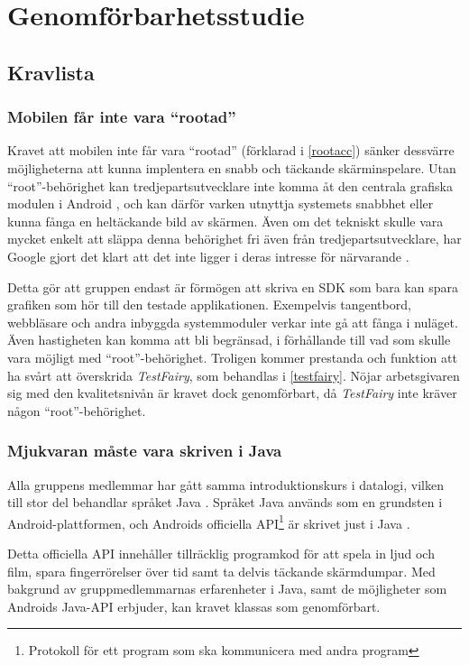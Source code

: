 \section{Genomförbarhetsstudie}
\subsection{Kravlista}
\subsubsection{Mobilen får inte vara ``rootad''}
Kravet att mobilen inte får vara ``rootad'' (förklarad i \ref{rootacc}) sänker dessvärre möjligheterna att kunna implentera en snabb och täckande skärminspelare. Utan ``root''-behörighet kan tredjepartsutvecklare inte komma åt den centrala grafiska modulen i Android \parencite{adoc}, och kan därför varken utnyttja systemets snabbhet eller kunna fånga en heltäckande bild av skärmen. Även om det tekniskt skulle vara mycket enkelt att släppa denna behörighet fri även från tredjepartsutvecklare, har Google gjort det klart att det inte ligger i deras intresse för närvarande \parencite{uhno}.

Detta gör att gruppen endast är förmögen att skriva en SDK som bara kan spara grafiken som hör till den testade applikationen. Exempelvis tangentbord, webbläsare och andra inbyggda systemmoduler verkar inte gå att fånga i nuläget. Även hastigheten kan komma att bli begränsad, i förhållande till vad som skulle vara möjligt med ``root''-behörighet. Troligen kommer prestanda och funktion att ha svårt att överskrida \textit{TestFairy}, som behandlas i \ref{testfairy}. Nöjar arbetsgivaren sig med den kvalitetsnivån är kravet dock genomförbart, då \textit{TestFairy} inte kräver någon ``root''-behörighet.

\subsubsection{Mjukvaran måste vara skriven i Java}
Alla gruppens medlemmar har gått samma introduktionskurs i datalogi, vilken till stor del behandlar språket Java \parencite{inda}. Språket Java används som en grundsten i Android-plattformen, och Androids officiella API\footnote{Protokoll för ett program som ska kommunicera med andra program} är skrivet just i Java \parencite{adoc}. 

Detta officiella API innehåller tillräcklig programkod för att spela in ljud och film, spara fingerrörelser över tid samt ta delvis täckande skärmdumpar. Med bakgrund av gruppmedlemmarnas erfarenheter i Java, samt de möjligheter som Androids Java-API erbjuder, kan kravet klassas som genomförbart.

